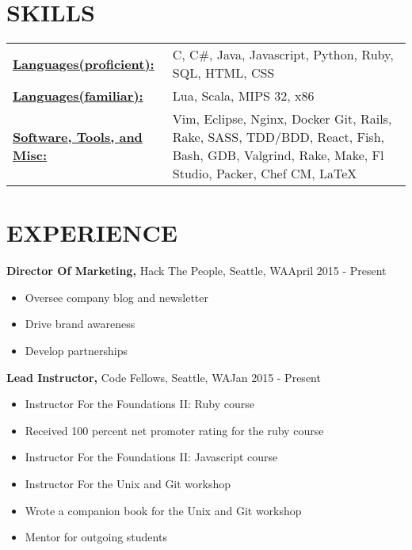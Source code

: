 \documentclass{res}
\begin{document}
 
\address{Seattle, WA charliec364@gmail.com }


\begin{resume}
\footnotesize

\section{SKILLS}
   \begin{tabular}{l p{3in}}
     \underline{\bf Languages(proficient):} & C, C\#, Java, Javascript, Python, Ruby, SQL, HTML, CSS \\
     \underline{\bf Languages(familiar):} & Lua, Scala, MIPS 32, x86 \\
     \underline{\bf Software, Tools, and Misc:} &  Vim, Eclipse, Nginx, Docker
                        Git, Rails, Rake, SASS, TDD/BDD, React,
                        Fish, Bash, GDB, Valgrind,  
                        Rake, Make, Fl Studio, Packer, Chef CM, \LaTeX\
 \end{tabular}
 
\section{EXPERIENCE}
  {\bf Director Of Marketing,} Hack The People, Seattle, WA\hfill April 2015 - Present 
  \begin{itemize} \itemsep -2pt  %
    \item Oversee company blog and newsletter
    \item Drive brand awareness
    \item Develop partnerships
  \end{itemize}

  {\bf Lead Instructor,} Code Fellows, Seattle, WA\hfill Jan 2015 - Present
  \begin{itemize} \itemsep -2pt  %
    \item Instructor For the Foundations II: Ruby course
    \item Received 100 percent net promoter rating for the ruby course
    \item Instructor For the Foundations II: Javascript course
    \item Instructor For the Unix and Git workshop
    \item Wrote a companion book for the Unix and Git workshop
    \item Mentor for outgoing students
  \end{itemize}


\end{resume}
\end{document}
